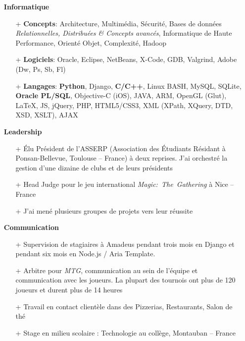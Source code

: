 \documentclass{res}
\begin{document}
\begin{resume}
	\begin{itemize}
	\item[] \textbf{Informatique}
		\begin{itemize}
                  \item[+] \textbf{Concepts}: Architecture, Multim\'edia, S\'ecurit\'e, Bases de donn\'ees \textit{Relationnelles, Distribu\'ees \& Concepts avanc\'es}, Informatique de Haute Performance, Orient\'e Objet, Complexit\'e, Hadoop
                  \item[+] \textbf{Logiciels}: Oracle, Eclipse, NetBeans, X-Code, GDB, Valgrind, Adobe (Dw, Ps, Sb, Fl)
                  \item[+] \textbf{Langages}: \textbf{Python}, Django, \textbf{C/C++}, Linux BASH, MySQL, SQLite, \textbf{Oracle PL/SQL}, Objective-C (iOS), JAVA, ARM, OpenGL (Glut), \LaTeX{}, JS, jQuery, PHP, HTML5/CSS3, XML (XPath, XQuery, DTD, XSD, XSLT), AJAX
		\end{itemize}    
	\end{itemize}

	\begin{itemize}
	\item[] \textbf{Leadership}
		\begin{itemize}
                   \item[+] \'Elu Pr\'esident de l'ASSERP (Association des \'Etudiants R\'esidant \`a Ponsan-Bellevue, Toulouse -- France) \`a deux reprises. J'ai orchestr\'e la gestion d'une dizaine de clubs et de leurs pr\'esidents
                  \item[+] Head Judge pour le jeu international \textit{Magic:~The~Gathering} \`a Nice -- France
                  \item[+] J'ai men\'e plusieurs groupes de projets vers leur r\'eussite
		\end{itemize}   
	\end{itemize}
	
	\begin{itemize}
	\item[] \textbf{Communication}
		\begin{itemize}
									\item[+] Supervision de stagiaires \`a Amadeus pendant trois mois en Django et pendant six mois en Node.js / Aria Template.
                  \item[+] Arbitre pour \textit{MTG}, communication au sein de l'\'equipe et communication avec les joueurs. La plupart des tournois ont plus de 120 joueurs et durent plus de 14 heures
                  \item[+] Travail en contact client\`ele dans des Pizzerias, Restaurants, Salon de th\'e
                  \item[+] Stage en milieu scolaire : Technologie au coll\`ege, Montauban -- France


\end{itemize}
\end{itemize}
\end{resume}
\end{document}
